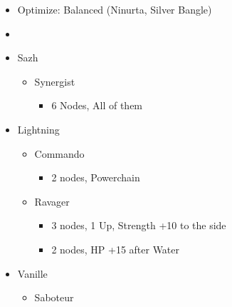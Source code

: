 \begin{paracol}{2}
\begin{menu}
\begin{itemize}
\begin{itemize}
\begin{itemize}
					      \item Optimize: Balanced (Ninurta, Silver Bangle)
				      \end{itemize}
			\end{itemize}
		\end{itemize}
	\end{menu}
	\switchcolumn
	\begin{menu}
		\begin{itemize}
			\paradigm
			\begin{itemize}
				\item {}%
				      {\paradigmline{\rav}{\com}{\rav}}%
				      {\paradigmline{\syn}{\com}{\sab}}%
				      {\paradigmline{\rav}{\com}{(\rav)}}%
				      {\paradigmline[4]{\textit{\rav}}{\textit{\rav}}{\textit{\sab}}}%
				      {\paradigmline{\rav}{[\rav]}{\rav}}%
				      {\paradigmline{[\syn]}{[\rav]}{\rav}}
			\end{itemize}
			\crystarium
			\begin{itemize}
				\item Sazh
				      \begin{itemize}
					      \item Synergist
					            \begin{itemize}
						            \item 6 Nodes, All of them
					            \end{itemize}
				      \end{itemize}
				\item Lightning
				      \begin{itemize}
					      \item Commando
					            \begin{itemize}
						            \item 2 nodes, Powerchain
					            \end{itemize}
					      \item Ravager
					            \begin{itemize}
						            \item 3 nodes, 1 Up, Strength +10 to the side
						            \item 2 nodes, HP +15 after Water
					            \end{itemize}
				      \end{itemize}
				\item Vanille
				      \begin{itemize}
					      \item Saboteur

\end{itemize}
\end{itemize}
\end{itemize}
\end{menu}
\end{paracol}
